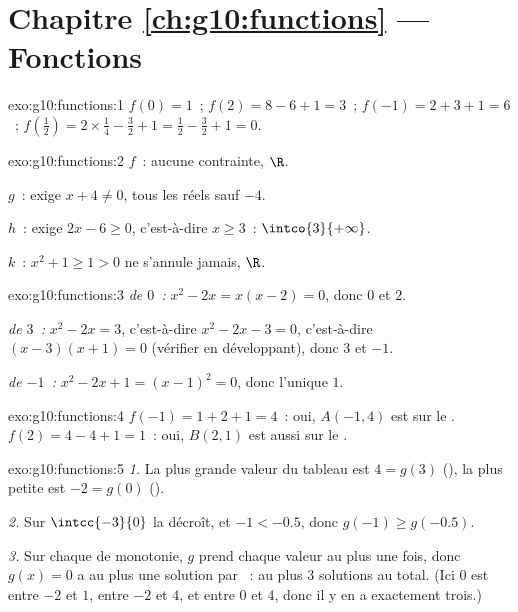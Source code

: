 \section*{Chapitre \ref{ch:g10:functions} --- Fonctions}

\begin{solution}{exo:g10:functions:1}
$f(0) = 1$~; \quad $f(2) = 8 - 6 + 1 = 3$~; \quad
$f(-1) = 2 + 3 + 1 = 6$~; \quad
$f\!\left(\tfrac12\right) = 2 \times \tfrac14 - \tfrac32 + 1 = \tfrac12 -
\tfrac32 + 1 = 0$.
\end{solution}

\begin{solution}{exo:g10:functions:2}
$f$~: aucune contrainte,  $\R$.

$g$~: exige $x + 4 \neq 0$,  tous les réels sauf
$-4$.

$h$~: exige $2x - 6 \geq 0$, c'est-à-dire $x \geq 3$~:  $\intco{3}{+\infty}$.

$k$~: $x^2 + 1 \geq 1 > 0$ ne s'annule jamais, 
$\R$.
\end{solution}

\begin{solution}{exo:g10:functions:3}
\emph{ de $0$~:} $x^2 - 2x = x(x-2) = 0$, donc $0$ et $2$.

\emph{ de $3$~:} $x^2 - 2x = 3$, c'est-à-dire
$x^2 - 2x - 3 = 0$, c'est-à-dire $(x-3)(x+1) = 0$ (vérifier en
développant), donc $3$ et $-1$.

\emph{ de $-1$~:} $x^2 - 2x + 1 = (x - 1)^2 = 0$, donc
l'unique  $1$.
\end{solution}

\begin{solution}{exo:g10:functions:4}
$f(-1) = 1 + 2 + 1 = 4$~: oui, $A(-1, 4)$ est sur le .
$f(2) = 4 - 4 + 1 = 1$~: oui, $B(2, 1)$ est aussi sur le .
\end{solution}

\begin{solution}{exo:g10:functions:5}
\emph{1.} La plus grande valeur du tableau est $4 = g(3)$ (), la
plus petite est $-2 = g(0)$ ().

\emph{2.} Sur $\intcc{-3}{0}$ la  décroît, et $-1 < -0.5$,
donc $g(-1) \geq g(-0.5)$.

\emph{3.} Sur chaque  de monotonie, $g$ prend chaque valeur au
plus une fois, donc $g(x) = 0$ a au plus une solution par ~: au
plus $3$ solutions au total. (Ici $0$ est entre $-2$ et $1$, entre $-2$ et
$4$, et entre $0$ et $4$, donc il y en a exactement trois.)
\end{solution}

